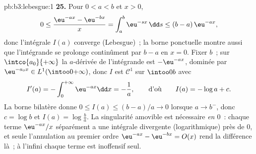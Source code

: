 \begin{solution}{pb:b3:lebesgue:1}
\textbf{25.} Pour $0 < a < b$ et $x > 0$,
\[
0 \leq \frac{\eu^{-ax} - \eu^{-bx}}{x}
= \int_a^b \eu^{-sx}\,\dd s \leq (b - a)\,\eu^{-ax},
\]
donc l'intégrale $I(a)$ converge (Lebesgue)~; la borne
ponctuelle montre aussi que l'intégrande se prolonge
continûment par $b - a$ en $x = 0$. Fixer $b$~; sur
$\intco{a_0}{+\infty}$ la $a$-dérivée de l'intégrande est
$-\eu^{-ax}$, dominée par $\eu^{-a_0x} \in
L^1(\intoo0{+\infty})$, donc $I$ est $\mathcal C^1$ sur
$\intoo0b$ avec
\[
I'(a) = -\int_0^{+\infty}\eu^{-ax}\dd x = -\frac1a,
\qquad\text{d'où}\qquad
I(a) = -\log a + c .
\]
La borne bilatère donne $0 \leq I(a) \leq (b-a)/a \to 0$
lorsque $a \to b^-$, donc $c = \log b$ et $I(a) =
\log\frac ba$. La singularité amovible est nécessaire
\emph{en $0$}~: chaque terme $\eu^{-ax}/x$ séparément a
une intégrale divergente (logarithmique) près de $0$, et
seule l'annulation au premier ordre $\eu^{-ax} -
\eu^{-bx} = O(x)$ rend la différence  là~; à
l'infini chaque terme est inoffensif seul.
\end{solution}

